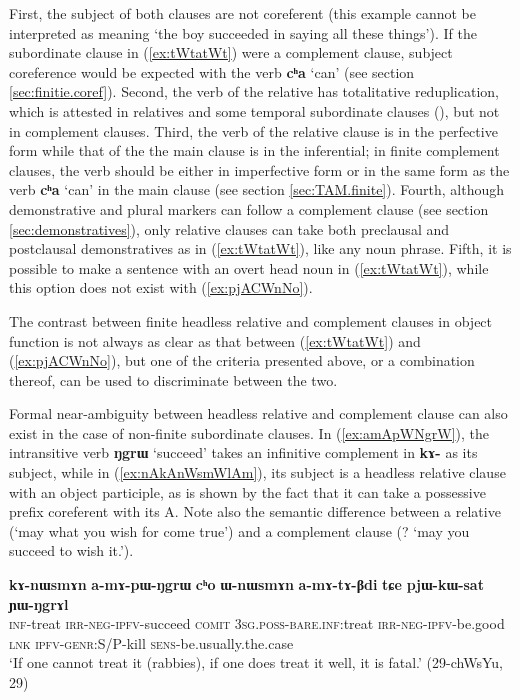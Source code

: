 \documentclass[oneside,a4paper,11pt]{article}
\newcommand{\ipa}[1]{\textbf{\phon#1}} %
\newcommand{\jpg}[2]{\ipa{#1} `#2'} %
\begin{document}
 First, the subject of both clauses are not coreferent (this example cannot be interpreted as meaning `the boy succeeded in saying all these things'). If the subordinate clause in (\ref{ex:tWtatWt}) were a complement clause, subject coreference would be expected with the verb 
\jpg{cʰa}{can} (see section \ref{sec:finitie.coref}). Second, the verb of the relative has totalitative reduplication, which is attested in relatives and some temporal subordinate clauses (\citealt[295]{jacques14linking}), but not in complement clauses. Third, the verb of the relative clause is in the perfective form while that of the the main clause is in the inferential; in finite complement clauses, the verb should be either in imperfective form or in the same form as the verb \jpg{cʰa}{can} in the main clause (see section \ref{sec:TAM.finite}). Fourth, although demonstrative and plural markers can follow a complement clause (see section \ref{sec:demonstratives}), only relative clauses can take both preclausal and postclausal demonstratives as in (\ref{ex:tWtatWt}), like any noun phrase. Fifth, it is possible to make a sentence with an overt head noun in (\ref{ex:tWtatWt}), while this option does not exist with (\ref{ex:pjACWnNo}). 

The contrast between finite headless relative and complement clauses in object function is not always as clear as that between (\ref{ex:tWtatWt}) and (\ref{ex:pjACWnNo}), but one of the criteria presented above, or a combination thereof, can be used to discriminate between the two.

Formal near-ambiguity between headless relative and complement clause can also exist in the case of non-finite subordinate clauses. In (\ref{ex:amApWNgrW}), the intransitive verb \jpg{ŋgrɯ}{succeed} takes an infinitive complement in \ipa{kɤ-} as its subject, while in (\ref{ex:nAkAnWsmWlAm}), its subject is a headless relative clause with an object participle, as is shown by the fact that it can take a possessive prefix coreferent with its A. Note also the semantic difference between a relative (`may what you wish for come true') and a complement clause (? `may you succeed to wish it.').

\begin{exe}
\ex \label{ex:amApWNgrW}
\gll 
\ipa{kɤ-nɯsmɤn} 	\ipa{a-mɤ-pɯ-ŋgrɯ} 	\ipa{cʰo} 	\ipa{ɯ-nɯsmɤn} 	\ipa{a-mɤ-tɤ-βdi} 	\ipa{tɕe} 	\ipa{pjɯ-kɯ-sat} 	\ipa{ɲɯ-ŋgrɤl} \\
\textsc{inf}-treat \textsc{irr-neg-ipfv}-succeed \textsc{comit} \textsc{3sg.poss-bare.inf}:treat  \textsc{irr-neg-ipfv}-be.good \textsc{lnk} \textsc{ipfv-genr:S/P}-kill \textsc{sens}-be.usually.the.case \\
\glt `If one cannot treat it (rabbies), if one does treat it well, it is fatal.' (29-chWsYu, 29)
\end{exe}
\end{document}
